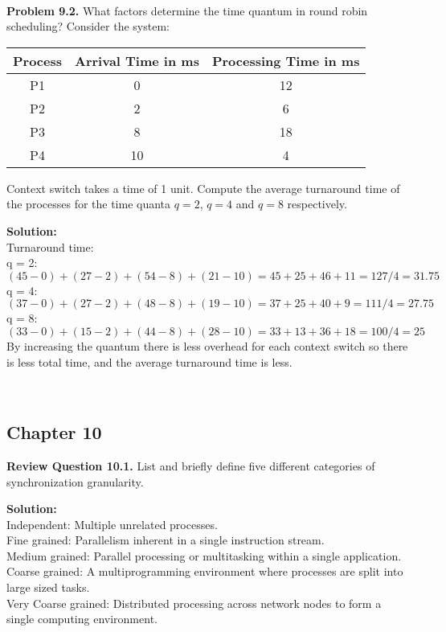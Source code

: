 \documentclass[12pt]{article}
\newcommand{\Problem}[1]{%
	\textbf{Problem #1.}%
}
\newcommand{\Review}[1]{%
	\textbf{Review Question #1.}%
}
\newcommand\Solution{%
	\noindent \textbf{Solution:}\\%
}
\begin{document}
~\\
\Problem{9.2} What factors determine the time quantum in round robin scheduling? Consider the system:
	\begin{table}[H]
		\centering
		\begin{tabular}{|c|c|c|}
			\hline
			\multicolumn{1}{|l|}{\textbf{Process}} & \textbf{Arrival Time in ms} & \multicolumn{1}{l|}{\textbf{Processing Time in ms}} \\ \hline
			P1	& 0	& 12 	\\
			P2	& 2	& 6 	\\
			P3	& 8	& 18	\\
			P4	& 10	& 4	\\
			\hline
		\end{tabular}
	\end{table}
	Context switch takes a time of 1 unit. Compute the average turnaround time of the processes for the time quanta $q = 2$, $q = 4$ and $q = 8$ respectively.
	
\Solution Turnaround time: \\
q = 2:$ (45 - 0) + (27 - 2) + (54 - 8) + (21 - 10) = 45 + 25 + 46 + 11 = 127/4 = 31.75$ \\
q = 4:$ (37 - 0) + (27 - 2) + (48 - 8) + (19 - 10) = 37 + 25 + 40 + 9 = 111/4 = 27.75$ \\
q = 8:$ (33 - 0) + (15 - 2) + (44 - 8) + (28 - 10) = 33 + 13 + 36 + 18 = 100/4 = 25$ \\
By increasing the quantum there is less overhead for each context switch so there is less total time, and the average turnaround time is less. 


~\\
\subsection*{Chapter 10}

\Review{10.1} List and briefly define five different categories of synchronization granularity.

\Solution  
Independent: Multiple unrelated processes.\\
Fine grained: Parallelism inherent in a single instruction stream.\\
Medium grained: Parallel processing or multitasking within a single application. \\
Coarse grained: A multiprogramming environment where processes are split into large sized tasks.\\
Very Coarse grained: Distributed processing across network nodes to form a single computing environment.\\
\end{document}
